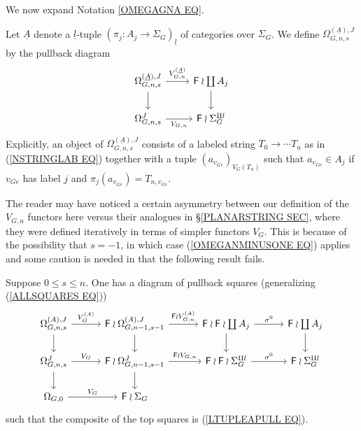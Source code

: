 \documentclass[a4paper,10pt]{article}%
\begin{document}
We now expand Notation \ref{OMEGAGNA EQ}.

\begin{notation}
	Let $\underline{A}$ denote a $\underline{l}$-tuple 
	$(\pi_j \colon A_j \to \Sigma_G)_{\underline{l}}$ of categories over $\Sigma_G$. We define $\Omega_{G,n,s}^{(\underline{A}),J}$ by the pullback diagram
\begin{equation}\label{LTUPLEAPULL EQ}
\begin{tikzcd}
	\Omega_{G,n,s}^{(\underline{A}),J} \ar{r}{V_{G,n}^{(\underline{A})}} \ar{d}& 
	\Fin \wr \coprod A_j \ar{d}
\\
	\Omega_{G,n,s}^{J} \ar{r}[swap]{V_{G,n}} & 
	\Fin \wr \Sigma_G^{\amalg l} 
\end{tikzcd}
\end{equation}
Explicitly, an object of $\Omega_{G,n,s}^{(\underline{A}),J}$ consists of a labeled string $T_0 \to \cdots T_n$ as in (\ref{NSTRINGLAB EQ})
together with 
a tuple $(a_{v_{Ge}})_{V_G(T_n)}$ such that
$a_{v_{Ge}} \in A_j$ if $v_{Ge}$ has label $j$ and 
$\pi_j (a_{v_{Ge}}) = T_{n,v_{Ge}}$.
\end{notation}


The reader may have noticed a certain asymmetry between our definition of the $V_{G,n}$ functors here versus their analogues in \S \ref{PLANARSTRING SEC}, where they were defined iteratively in terms of simpler functors $V_G$. This is because of the possibility that $s=-1$, in which case (\ref{OMEGANMINUSONE EQ}) applies and some caution is needed in that the following result fails.


\begin{proposition}
Suppose $0\leq s \leq n$. One has a diagram of pullback squares
(generalizing (\ref{ALLSQUARES EQ}))
\begin{equation}\label{ALLSQUARESJ EQ}
\begin{tikzcd}[column sep = 3em]
	\Omega^{(A),J}_{G,n,s} \ar{r}{V_G^{(A)}} \ar{d}& 
	\Fin \wr \Omega^{(A),J}_{G,n-1,s-1} \ar{r}{\Fin \wr V_{G,n}^{(A)}} \ar{d}&
	\Fin \wr \Fin \wr \coprod A_j  \ar{d} \ar{r}{\sigma^0} &
	\Fin \wr \coprod A_j \ar{d}
\\
	\Omega_{G,n,s}^J \ar{r}{V_G} \ar{d} &
	\Fin \wr \Omega_{G,n-1,s-1}^J \ar{r}{\Fin \wr V_{G,n}} \ar{d} &
	\Fin \wr \Fin \wr \Sigma_G^{\amalg l} \ar{r}{\sigma^0} &
	\Fin \wr \Sigma_G^{\amalg l}
\\
	\Omega_{G,0} \ar{r}{V_G} &
	\Fin \wr \Sigma_G
\end{tikzcd}
\end{equation}
such that the composite of the top squares is (\ref{LTUPLEAPULL EQ}).
\end{proposition}
\end{document}
